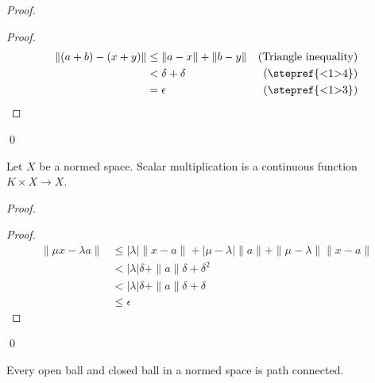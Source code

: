 \begin{proof}
  \pf
  \begin{proof}
    \pf
    \begin{align*}
      \| (a + b) - (x + y) \| & \leq \| a - x \| + \| b - y \| & (\text{Triangle inequality}) \\
      & < \delta + \delta & (\text{\stepref{<1>4}}) \\
      & = \epsilon & (\text{\stepref{<1>3}})
    \end{align*}
  \end{proof}
  \qed
\end{proof}

\begin{prop}
  Let $X$ be a normed space. Scalar multiplication is a continuous function $K \times X \rightarrow X$.
\end{prop}

\begin{proof}
  \pf
  \begin{proof}
    \pf
    \begin{align*}
      \| \mu x - \lambda a \| & \leq | \lambda | \| x - a \| + | \mu - \lambda | \| a \| + \| \mu - \lambda \| \| x - a \| \\
      & < | \lambda | \delta + \| a \| \delta + \delta^2 \\
      & < | \lambda | \delta + \| a \| \delta + \delta \\
      & \leq \epsilon
    \end{align*}
  \end{proof}
  \qed
\end{proof}

\begin{prop}
  Every open ball and closed ball in a normed space is path connected.
\end{prop}

